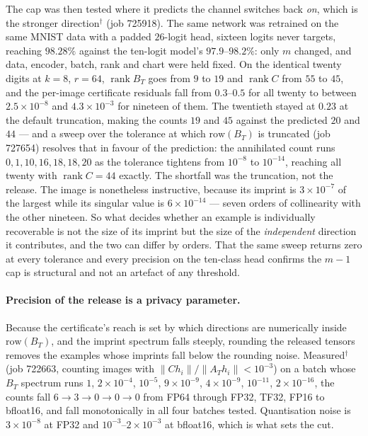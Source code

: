 The cap was then tested where it predicts the channel switches back
\emph{on}, which is the stronger direction$^\dagger$ (job 725918). The same
network was retrained on the same MNIST data with a padded $26$-logit head,
sixteen logits never targets, reaching $98.28\%$ against the ten-logit model's
$97.9$--$98.2\%$: only $m$ changed, and data, encoder, batch, rank and chart
were held fixed. On the identical twenty digits at $k=8$, $r=64$,
$\operatorname{rank}B_T$ goes from $9$ to $19$ and $\operatorname{rank}C$ from
$55$ to $45$, and the per-image certificate residuals fall from $0.3$--$0.5$
for all twenty to between $2.5\times10^{-8}$ and $4.3\times10^{-3}$ for
nineteen of them. The twentieth stayed at $0.23$ at the default
truncation, making the counts $19$ and $45$ against the predicted $20$ and
$44$ --- and a sweep over the tolerance at which $\mathrm{row}(B_T)$ is
truncated (job 727654) resolves that in favour of the prediction: the
annihilated count runs $0,1,10,16,18,18,20$ as the tolerance tightens from
$10^{-8}$ to $10^{-14}$, reaching all twenty with $\operatorname{rank}C=44$
exactly. The shortfall was the truncation, not the release. The image is
nonetheless instructive, because its imprint is $3\times10^{-7}$ of the
largest while its singular value is $6\times10^{-14}$ --- seven orders of
collinearity with the other nineteen. So what decides whether an example is
individually recoverable is not the size of its imprint but the size of the
\emph{independent} direction it contributes, and the two can differ by orders.
That the same sweep returns zero at every tolerance and every precision on the
ten-class head confirms the $m-1$ cap is structural and not an artefact of any
threshold.

\paragraph{Precision of the release is a privacy parameter.} Because the
certificate's reach is set by which directions are numerically inside
$\mathrm{row}(B_T)$, and the imprint spectrum falls steeply, rounding the
released tensors removes the examples whose imprints fall below the rounding
noise. Measured$^\dagger$ (job 722663, counting images with
$\|Ch_i\|/\|A_Th_i\|<10^{-3}$) on a batch whose $B_T$ spectrum runs
$1$, $2\times10^{-4}$, $10^{-5}$, $9\times10^{-9}$, $4\times10^{-9}$,
$10^{-11}$, $2\times10^{-16}$, the counts fall $6\to3\to0\to0\to0$ from FP64
through FP32, TF32, FP16 to bfloat16, and fall monotonically in all four
batches tested. Quantisation noise is $3\times10^{-8}$ at FP32 and
$10^{-3}$--$2\times10^{-3}$ at bfloat16, which is what sets the cut.

